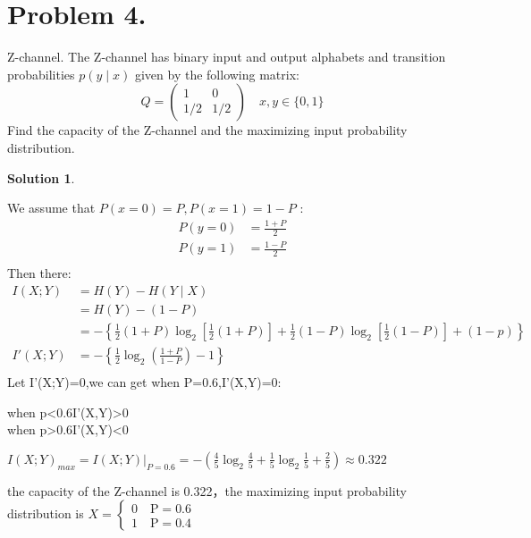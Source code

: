 \documentclass[UTF8,oneside]{article}
\newtheorem*{Solution}{Solution}
\begin{document}
\section*{Problem 4.}
Z-channel. The Z-channel has binary input and output alphabets and transition probabilities $p(y \mid x)$ given by the following matrix:
$$
Q=\left(\begin{array}{cc}
1 & 0 \\
1 / 2 & 1 / 2
\end{array}\right) \quad x, y \in\{0,1\}
$$
Find the capacity of the Z-channel and the maximizing input probability distribution.
\begin{Solution}
\end{Solution}
We assume that $P(x=0)=P, P(x=1)=1-P$ :
\begin{align*}
P(y=0)&=\frac{1+P}{2} \\
P(y=1)&=\frac{1-P}{2} \\
\end{align*}
Then there:
\begin{align*}
I(X ; Y)&=H(Y)-H(Y \mid X) \\
&=H(Y)-(1-P) \\
&=-\left\{\frac{1}{2}(1+P) \log _{2}\left[\frac{1}{2}(1+P)\right]+\frac{1}{2}(1-P) \log _{2}\left[\frac{1}{2}(1-P)\right]+(1-p)\right\}\\
I'(X;Y)&=-\left\{\frac{1}{2} \log _{2}\left(\frac{1+P}{1-P}\right)-1\right\}\\
\end{align*}
Let I'(X;Y)=0,we can get when P=0.6,I'(X,Y)=0:\\
\begin{center}
when p<0.6\qquad I'(X,Y)>0\\
when p>0.6\qquad I'(X,Y)<0\\
\end{center}
\begin{center}
$I(X;Y)_{max}=I(X;Y)|_{P=0.6}=-\left(\frac{4}{5} \log _{2} \frac{4}{5}+\frac{1}{5} \log _{2} \frac{1}{5}+\frac{2}{5}\right)\approx0.322$
\end{center}

the capacity of the Z-channel is 0.322，the maximizing input probability distribution is $X=\left\{\begin{array}{l}0 \quad\mathrm{P}=0.6 \\ 1 \quad\mathrm{P}=0.4\end{array}\right.$
\end{document}
